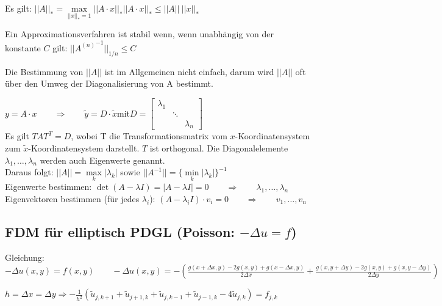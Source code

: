 Es gilt: $||A||_*=\max\limits_{||x||_*=1}||A\cdot x||_*$\qquad$||A\cdot x||_*\leq||A||~||x||_*$

Ein Approximationsverfahren ist stabil wenn, wenn unabhängig von der konstante $C$ gilt:
$\boxed{||{A^{(n)}}^{-1}||_{1/n}\leq C}$

Die Bestimmung von $||A||$ ist im Allgemeinen nicht einfach, darum wird $||A||$ oft über den Umweg der Diagonalisierung von A bestimmt.

$y=A\cdot x\qquad\Rightarrow\qquad\tilde{y}=D\cdot\tilde{x}$\qquad mit\qquad $D=\begin{bmatrix}\lambda_1&&\\&\ddots&\\&&\lambda_n\end{bmatrix}$\\

Es gilt $TAT^T=D$, wobei T die Transformationsmatrix vom $x$-Koordinatensystem zum $\tilde{x}$-Koordinatensystem darstellt. $T$ ist orthogonal.
Die Diagonalelemente $\lambda_1,\ldots,\lambda_n$ werden auch Eigenwerte genannt.\\

Daraus folgt: $\boxed{||A||=\max\limits_{k}|\lambda_k|}$ sowie $\boxed{||A^{-1}||=\{\min\limits_{k}|\lambda_k|\}^{-1}}$\\

Eigenwerte bestimmen: $\boxed{\det(A-\lambda I)=|A-\lambda I|=0}\qquad \Rightarrow \qquad \lambda_1,\ldots,\lambda_n$\\
Eigenvektoren bestimmen (für jedes $\lambda_i$): $(A-\lambda_i I) \cdot v_i=0\qquad \Rightarrow \qquad v_1,\ldots,v_n$

\subsection{FDM für elliptisch PDGL (Poisson: $-\Delta u = f$)}
Gleichung:    $-\Delta u(x,y)= f(x,y) \qquad
  -\Delta u(x,y) = -\left(\frac{g(x+\Delta x,y ) -2 g(x,y)+ g(x-\Delta x,y)}{2\Delta x} +
  \frac{g(x,y+\Delta y) -2 g(x,y)+ g(x,y-\Delta y)}{2\Delta y}\right)$

$h=\Delta x = \Delta y \Rightarrow \boxed{-\frac 1 {h^2} (\tilde{u}_{j,k+1} +
    \tilde{u}_{j+1,k} + \tilde{u}_{j,k-1} + \tilde{u}_{j-1,k} - 4 \tilde{u}_{j,k})
    = f_{j, k}}$\\[0.4cm]


